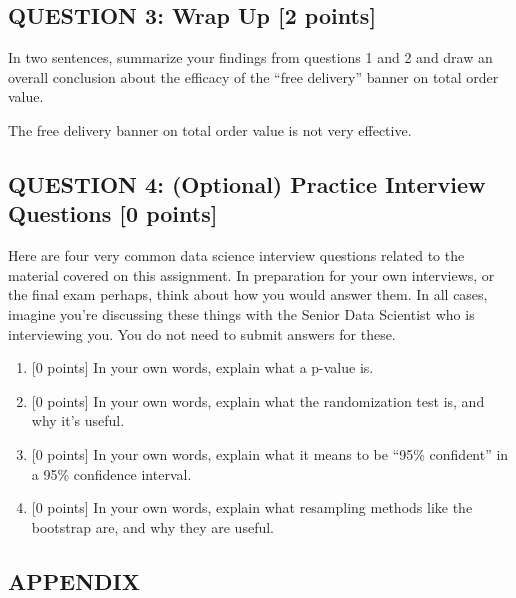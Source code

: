 \documentclass[
]{article}
\begin{document}
\(\;\)

\(\;\)

\hypertarget{question-3-wrap-up-2-points}{%
\subsection{QUESTION 3: Wrap Up {[}2
points{]}}\label{question-3-wrap-up-2-points}}

In two sentences, summarize your findings from questions 1 and 2 and
draw an overall conclusion about the efficacy of the ``free delivery''
banner on total order value.

The free delivery banner on total order value is not very effective.

\hypertarget{question-4-optional-practice-interview-questions-0-points}{%
\subsection{QUESTION 4: (Optional) Practice Interview Questions {[}0
points{]}}\label{question-4-optional-practice-interview-questions-0-points}}

Here are four very common data science interview questions related to
the material covered on this assignment. In preparation for your own
interviews, or the final exam perhaps, think about how you would answer
them. In all cases, imagine you're discussing these things with the
Senior Data Scientist who is interviewing you. You do not need to submit
answers for these.

\begin{enumerate}
\def\labelenumi{(\alph{enumi})}
\item
  {[}0 points{]} In your own words, explain what a p-value is.
\item
  {[}0 points{]} In your own words, explain what the randomization test
  is, and why it's useful.
\item
  {[}0 points{]} In your own words, explain what it means to be ``95\%
  confident'' in a 95\% confidence interval.
\item
  {[}0 points{]} In your own words, explain what resampling methods like
  the bootstrap are, and why they are useful.
\end{enumerate}

\newpage

\hypertarget{appendix}{%
\subsection{APPENDIX}\label{appendix}}
\end{document}
